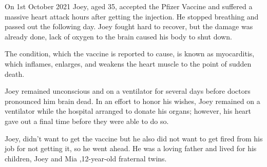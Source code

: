 On 1st October 2021 Joey, aged 35, accepted the Pfizer Vaccine and suffered a
massive heart attack hours after getting the injection. He stopped breathing and
passed out the following day. Joey fought hard to recover, but the damage was
already done, lack of oxygen to the brain caused his body to shut down.

The condition, which the vaccine is reported to cause, is known as myocarditis,
which inflames, enlarges, and weakens the heart muscle to the point of sudden
death.

Joey remained unconscious and on a ventilator for several days before doctors
pronounced him brain dead. In an effort to honor his wishes, Joey remained on a
ventilator while the hospital arranged to donate his organs; however, his heart
gave out a final time before they were able to do so.

Joey, didn’t want to get the vaccine but he also did not want to get fired from
his job for not getting it, so he went ahead.
He was a loving father and lived for his children, Joey and Mia ,12-year-old
fraternal twins.

